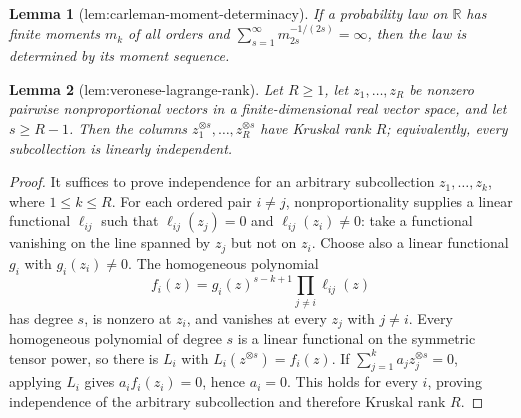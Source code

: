 \documentclass{article}
\newtheorem{lemma}{Lemma}
\begin{document}
\begin{lemma}[lem:carleman-moment-determinacy]\label{lem:carleman-moment-determinacy}
If a probability law on \(\mathbb R\) has finite moments \(m_k\) of all orders and \(\sum_{s=1}^{\infty}m_{2s}^{-1/(2s)}=\infty\), then the law is determined by its moment sequence.
\end{lemma}

\begin{lemma}[lem:veronese-lagrange-rank]\label{lem:veronese-lagrange-rank}
Let \(R\ge1\), let \(z_1,\ldots,z_R\) be nonzero pairwise nonproportional vectors in a finite-dimensional real vector space, and let \(s\ge R-1\). Then the columns \(z_1^{\otimes s},\ldots,z_R^{\otimes s}\) have Kruskal rank \(R\); equivalently, every subcollection is linearly independent.
\end{lemma}
\begin{proof}
It suffices to prove independence for an arbitrary subcollection \(z_1,\ldots,z_k\), where \(1\le k\le R\). For each ordered pair \(i\ne j\), nonproportionality supplies a linear functional \(\ell_{ij}\) such that \(\ell_{ij}(z_j)=0\) and \(\ell_{ij}(z_i)\ne0\): take a functional vanishing on the line spanned by \(z_j\) but not on \(z_i\). Choose also a linear functional \(g_i\) with \(g_i(z_i)\ne0\). The homogeneous polynomial
\[
 f_i(z)=g_i(z)^{s-k+1}\prod_{j\ne i}\ell_{ij}(z)
\]
has degree \(s\), is nonzero at \(z_i\), and vanishes at every \(z_j\) with \(j\ne i\). Every homogeneous polynomial of degree \(s\) is a linear functional on the symmetric tensor power, so there is \(L_i\) with \(L_i(z^{\otimes s})=f_i(z)\). If \(\sum_{j=1}^k a_jz_j^{\otimes s}=0\), applying \(L_i\) gives \(a_if_i(z_i)=0\), hence \(a_i=0\). This holds for every \(i\), proving independence of the arbitrary subcollection and therefore Kruskal rank \(R\).
\end{proof}
\end{document}
